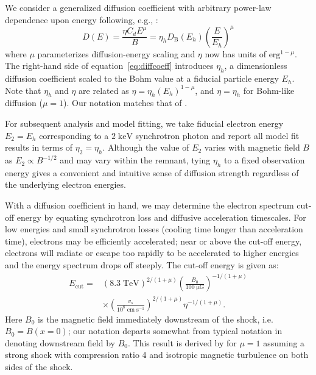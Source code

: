 \documentclass[iop, apj, numberedappendix]{emulateapj}
\newcommand*{\mt}{\mathrm}
\newcommand*{\unit}[1]{\;\mt{#1}}  %
\newcommand*{\Ecut}{E_{\mt{cut}}}
\newcommand*{\muG}{\unit{\mu G}}
\begin{document}
We consider a generalized diffusion coefficient with arbitrary
power-law dependence upon energy following, e.g., \citet{parizot2006}:
\begin{equation} \label{eq:diffcoeff}
    D(E) = \frac{\eta C_d E^\mu}{B}
         = \eta_h D_{\mt{B}}\left(E_h\right) \left(\frac{E}{E_h}\right)^\mu
\end{equation}
where $\mu$ parameterizes diffusion-energy scaling and $\eta$ now has units
of $\mt{erg}^{1-\mu}$.  The right-hand side of equation~\eqref{eq:diffcoeff}
introduces $\eta_h$, a dimensionless diffusion coefficient scaled to the Bohm
value at a fiducial particle energy $E_h$.  Note that $\eta_h$ and $\eta$ are
related as $\eta = \eta_h (E_h)^{1-\mu}$, and $\eta = \eta_h$ for Bohm-like
diffusion ($\mu = 1$).  Our notation matches that of .

For subsequent analysis and model fitting, we take fiducial electron energy
$E_2 = E_h$ corresponding to a $2 \unit{keV}$ synchrotron photon and report all
model fit results in terms of $\eta_2 = \eta_h$.  Although the value of $E_2$
varies with magnetic field $B$ as $E_2 \propto B^{-1/2}$ and may vary within
the remnant, tying $\eta_h$ to a fixed observation energy gives a convenient
and intuitive sense of diffusion strength regardless of the underlying electron
energies.

With a diffusion coefficient in hand, we may determine the electron spectrum
cut-off energy by equating synchrotron loss and diffusive acceleration
timescales.  For low energies and small synchrotron losses (cooling time longer
than acceleration time), electrons may be efficiently accelerated; near or
above the cut-off energy, electrons will radiate or escape too rapidly to be
accelerated to higher energies and the energy spectrum drops off steeply.  The
cut-off energy is given as:
\begin{align} \label{eq:ecut}
    \Ecut =
        &\left(8.3\unit{TeV}\right)^{2/(1+\mu)}
        \left(\frac{B_0}{100 \muG}\right)^{-1/(1+\mu)} \nonumber \\
        &\times \left(\frac{v_s}{10^8 \unit{cm\;s^{-1}}}\right)^{2/(1+\mu)}
        \eta^{-1 / (1+\mu)} .
\end{align}
Here $B_0$ is the magnetic field immediately downstream of the shock, i.e.
$B_0 = B(x=0)$; our notation departs somewhat from typical notation in denoting
downstream field by $B_0$.
This result is derived by \citet{parizot2006} for $\mu=1$ assuming a strong
shock with compression ratio 4 and isotropic magnetic turbulence on both sides
of the shock.
\end{document}
